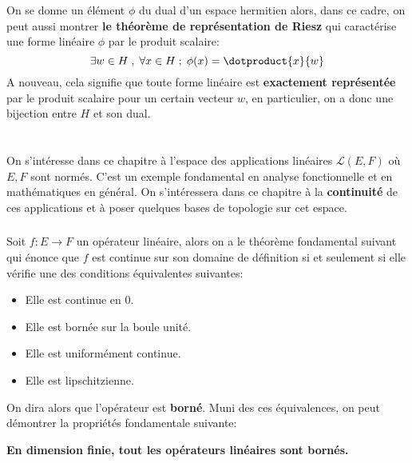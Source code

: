 \subsection*{}
On se donne un élément \(\phi\) du dual d'un espace hermitien alors, dans ce cadre, on peut aussi montrer \textbf{le théorème de représentation de Riesz} qui caractérise une forme linéaire \(\phi\) par le produit scalaire:
\[
   \exists w \in H \; , \; \forall x \in H \; ; \; \phi(x) = \dotproduct{x}{w}   
\]
A nouveau, cela signifie que toute forme linéaire est \textbf{exactement représentée} par le produit scalaire pour un certain vecteur \(w\), en particulier, on a donc une bijection entre \(H\) et son dual.\<
\chapter*{}
On s'intéresse dans ce chapitre à l'espace des applications linéaires \(\mathcal{L}(E, F)\) où \( E, F \) sont normés. C'est un exemple fondamental en analyse fonctionnelle et en mathématiques en général. On s'intéressera dans ce chapitre à la \textbf{continuité} de ces applications et à poser quelques bases de topologie sur cet espace.
\subsection*{}
Soit \(f : E \rightarrow F\) un opérateur linéaire, alors on a le théorème fondamental suivant qui énonce que \(f\) est continue sur son domaine de définition si et seulement si elle vérifie une des conditions équivalentes suivantes:
\begin{itemize}
   \item Elle est continue en 0.
   \item Elle est bornée sur la boule unité.
   \item Elle est uniformément continue.
   \item Elle est lipschitzienne.
\end{itemize}
On dira alors que l'opérateur est \textbf{borné}. Muni des ces équivalences, on peut démontrer la propriétés fondamentale suivante:
\begin{center}
   \textbf{En dimension finie, tout les opérateurs linéaires sont bornés.}
\end{center}
